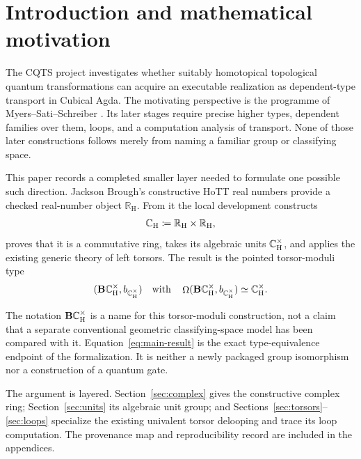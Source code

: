 \section{Introduction and mathematical motivation}
\label{sec:introduction}

The CQTS project investigates whether suitably homotopical topological quantum
transformations can acquire an executable realization as dependent-type
transport in Cubical Agda.  The motivating perspective is the programme of
Myers--Sati--Schreiber \cite{mss}.  Its later stages require precise higher
types, dependent families over them, loops, and a computation analysis of
transport.  None of those later constructions follows merely from naming a
familiar group or classifying space.

This paper records a completed smaller layer needed to formulate one possible
such direction.  Jackson Brough's constructive HoTT real numbers provide a
checked real-number object $\mathbb{R}_{\mathrm H}$.  From it the local
development constructs
\begin{equation}
  \mathbb{C}_{\mathrm H}\coloneqq\mathbb{R}_{\mathrm H}\times\mathbb{R}_{\mathrm H},
\end{equation}
proves that it is a commutative ring, takes its algebraic units $\mathbb{C}_{\mathrm H}^{\times}$,
and applies the existing generic theory of left torsors.  The result is the
pointed torsor-moduli type
\begin{equation}
 (\mathbf{B}\mathbb{C}_{\mathrm H}^{\times},b_{\mathbb{C}_{\mathrm H}^{\times}})\quad\text{with}\quad
 \mathop{\Omega}(\mathbf{B}\mathbb{C}_{\mathrm H}^{\times},b_{\mathbb{C}_{\mathrm H}^{\times}})\simeq\mathbb{C}_{\mathrm H}^{\times} .
 \label{eq:main-result}
\end{equation}

The notation $\mathbf{B}\mathbb{C}_{\mathrm H}^{\times}$ is a name for this torsor-moduli construction, not
a claim that a separate conventional geometric classifying-space model has
been compared with it.  Equation~\eqref{eq:main-result} is the exact
type-equivalence endpoint of the formalization.  It is neither a newly
packaged group isomorphism nor a construction of a quantum gate.

The argument is layered.  Section~\ref{sec:complex} gives the constructive
complex ring; Section~\ref{sec:units} its algebraic unit group; and
Sections~\ref{sec:torsors}--\ref{sec:loops} specialize the existing
univalent torsor delooping and trace its loop computation.  The provenance
map and reproducibility record are included in the appendices.
